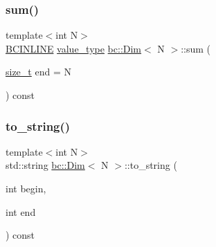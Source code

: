 \mbox{\label{structbc_1_1Dim_a82c57cd962cde9065f817d444b7e7211}} 
\subsubsection{\texorpdfstring{sum()}{sum()}\hspace{0.1cm}{\footnotesize\ttfamily [2/2]}}
{\footnotesize\ttfamily template$<$int N$>$ \\
\hyperlink{common_8h_a6699e8b0449da5c0fafb878e59c1d4b1}{B\+C\+I\+N\+L\+I\+NE} \hyperlink{structbc_1_1Dim_af59ff554825273cf6bd9619b2c78c196}{value\+\_\+type} \hyperlink{structbc_1_1Dim}{bc\+::\+Dim}$<$ N $>$\+::sum (\begin{DoxyParamCaption}\item[{\hyperlink{structbc_1_1Dim_a8c7c7ae0cd96c3923e76097089747290}{size\+\_\+t}}]{end = {\ttfamily N} }\end{DoxyParamCaption}) const\hspace{0.3cm}{\ttfamily [inline]}}

\mbox{\label{structbc_1_1Dim_abd0f93efda4f8a22e86c236e7d4baa1b}} 
\subsubsection{\texorpdfstring{to\+\_\+string()}{to\_string()}\hspace{0.1cm}{\footnotesize\ttfamily [1/2]}}
{\footnotesize\ttfamily template$<$int N$>$ \\
std\+::string \hyperlink{structbc_1_1Dim}{bc\+::\+Dim}$<$ N $>$\+::to\+\_\+string (\begin{DoxyParamCaption}\item[{int}]{begin,  }\item[{int}]{end }\end{DoxyParamCaption}) const\hspace{0.3cm}{\ttfamily [inline]}}

\mbox{\label{structbc_1_1Dim_a3e4e7c09e50367be33dd2efb5eaedf52}} 
